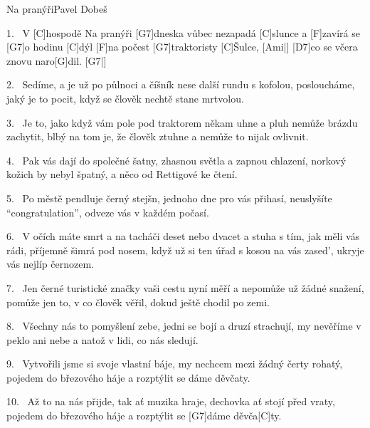 \begin{song}{Na pranýři}{Pavel Dobeš}

\begin{xverse}{1.~}
V [\large C]hospodě Na pranýři [\large G7]dneska vůbec nezapadá [\large C]slunce
a [\large F]zavírá se [\large G7]o hodinu [\large C]dýl
[\large F]na počest [\large G7]traktoristy [\large C]{Šul}ce, [\large Ami|]{}
[\large D7]co se včera znovu naro[\large G]dil. [\large G7|]{}
\end{xverse}

\begin{xverse}{2.~}
Sedíme, a je už po půlnoci
a číšník nese další rundu s kofolou,
posloucháme, jaký je to pocit,
když se člověk nechtě stane mrtvolou.
\end{xverse}

\begin{xverse}{3.~}
Je to, jako když vám pole pod traktorem někam uhne
a pluh nemůže brázdu zachytit,
blbý na tom je, že člověk ztuhne
a nemůže to nijak ovlivnit.
\end{xverse}

\begin{xverse}{4.~}
Pak vás dají do společné šatny,
zhasnou světla a zapnou chlazení,
norkový kožich by nebyl špatný,
a něco od Rettigové ke čtení.
\end{xverse}

\begin{xverse}{5.~}
Po městě pendluje černý stejšn,
jednoho dne pro vás přihasí,
neuslyšíte ``congratulation'',
odveze vás v každém počasí.
\end{xverse}

\begin{xverse}{6.~}
V očích máte smrt a na tacháči deset nebo dvacet
a stuha s tím, jak měli vás rádi, příjemně šimrá pod nosem,
když už si ten úřad s kosou na vás zased',
ukryje vás nejlíp černozem.
\end{xverse}

\begin{xverse}{7.~}
Jen černé turistické značky vaši cestu nyní měří
a nepomůže už žádné snažení,
pomůže jen to, v co člověk věřil,
dokud ještě chodil po zemi.
\end{xverse}

\begin{xverse}{8.~}
Všechny nás to pomyšlení zebe,
jedni se bojí a druzí strachují,
my nevěříme v peklo ani nebe
a natož v lidi, co nás sledují.
\end{xverse}

\begin{xverse}{9.~}
Vytvořili jsme si svoje vlastní báje,
my nechcem mezi žádný čerty rohatý,
pojedem do březového háje
a rozptýlit se dáme děvčaty.
\end{xverse}

\begin{xverse}{10.~}
Až to na nás přijde, tak ať muzika hraje,
dechovka ať stojí před vraty,
pojedem do březového háje
a rozptýlit se [\large G7]dáme děvča[\large C]ty.
\end{xverse}

\end{song}



